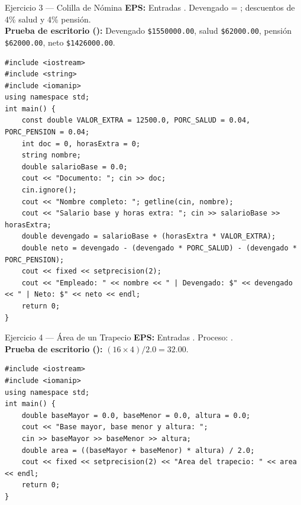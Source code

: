 \documentclass[11pt,letterpaper]{article}
\begin{document}
\begin{solucion}{Ejercicio 3 --- Colilla de Nómina}
\textbf{EPS:} Entradas . Devengado = ; descuentos de 4\% salud y 4\% pensión.\\
\textbf{Prueba de escritorio ():} Devengado \texttt{\$1550000.00}, salud \texttt{\$62000.00}, pensión \texttt{\$62000.00}, neto \texttt{\$1426000.00}.
\end{solucion}
\begin{lstlisting}[style=cppmonitoria]
#include <iostream>
#include <string>
#include <iomanip>
using namespace std;
int main() {
    const double VALOR_EXTRA = 12500.0, PORC_SALUD = 0.04, PORC_PENSION = 0.04;
    int doc = 0, horasExtra = 0;
    string nombre;
    double salarioBase = 0.0;
    cout << "Documento: "; cin >> doc;
    cin.ignore();
    cout << "Nombre completo: "; getline(cin, nombre);
    cout << "Salario base y horas extra: "; cin >> salarioBase >> horasExtra;
    double devengado = salarioBase + (horasExtra * VALOR_EXTRA);
    double neto = devengado - (devengado * PORC_SALUD) - (devengado * PORC_PENSION);
    cout << fixed << setprecision(2);
    cout << "Empleado: " << nombre << " | Devengado: $" << devengado << " | Neto: $" << neto << endl;
    return 0;
}
\end{lstlisting}

\begin{solucion}{Ejercicio 4 --- Área de un Trapecio}
\textbf{EPS:} Entradas . Proceso: .\\
\textbf{Prueba de escritorio ():} $(16 \times 4) / 2.0 = 32.00$.
\end{solucion}
\begin{lstlisting}[style=cppmonitoria]
#include <iostream>
#include <iomanip>
using namespace std;
int main() {
    double baseMayor = 0.0, baseMenor = 0.0, altura = 0.0;
    cout << "Base mayor, base menor y altura: ";
    cin >> baseMayor >> baseMenor >> altura;
    double area = ((baseMayor + baseMenor) * altura) / 2.0;
    cout << fixed << setprecision(2) << "Area del trapecio: " << area << endl;
    return 0;
}
\end{lstlisting}
\end{document}
